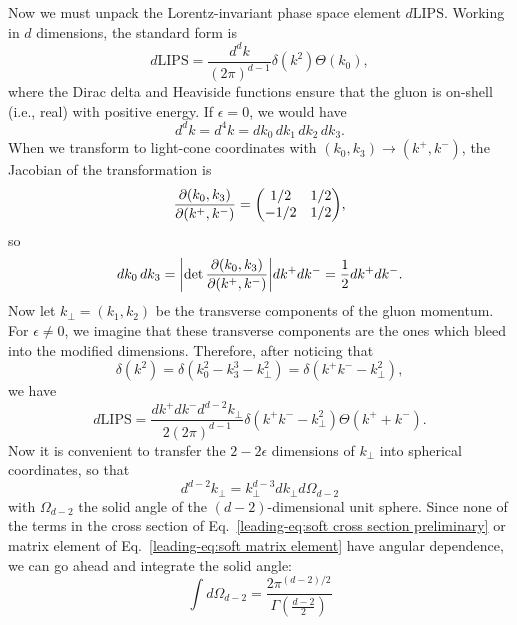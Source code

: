 \documentclass[../thesis.tex]{subfiles}
\providecommand{\LIPS}{\mathrm{LIPS}}
\begin{document}
	Now we must unpack the Lorentz-invariant phase space element $d\LIPS$. Working in $d$ dimensions, the standard form is
	\begin{equation}
		d\LIPS = \frac{d^d k}{(2\pi)^{d-1}}\delta(k^2)\Theta(k_0),
	\end{equation}
	where the Dirac delta and Heaviside functions ensure that the gluon is on-shell (i.e., real) with positive energy. If $\epsilon = 0$, we would have
	\begin{equation}
		d^d k = d^4 k = dk_0 \,dk_1 \,dk_2 \,dk_3.
	\end{equation}
	When we transform to light-cone coordinates with $(k_0, k_3) \to (k^+, k^-)$, the Jacobian of the transformation is
	\begin{equation}
		\frac{\partial(k_0, k_3)}{\partial(k^+, k^-)} = \mqty(1/2 & 1/2 \\ -1/2 & 1/2),
	\end{equation}
	so
	\begin{equation}
		dk_0 \, dk_3 = \abs{\det \frac{\partial(k_0, k_3)}{\partial(k^+, k^-)}} dk^+ dk^- = \frac{1}{2} dk^+ dk^-.
	\end{equation}
	Now let $k_\perp = (k_1, k_2)$ be the transverse components of the gluon momentum. For $\epsilon \neq 0$, we imagine that these transverse components are the ones which bleed into the modified dimensions. Therefore, after noticing that
	\begin{equation}
		\delta(k^2) = \delta(k_0^2 - k_3^3 - k_\perp^2) = \delta(k^+ k^- - k_\perp^2),
	\end{equation}
	we have
	\begin{equation}
		d\LIPS = \frac{dk^+ dk^- d^{d-2}k_\perp}{2(2\pi)^{d-1}} \delta(k^+ k^- - k_\perp^2)\Theta(k^+ + k^-).
	\end{equation}
	Now it is convenient to transfer the $2 - 2\epsilon$ dimensions of $k_\perp$ into spherical coordinates, so that
	\begin{equation}
		d^{d - 2}k_\perp = k_\perp^{d-3} dk_\perp d\Omega_{d-2}
	\end{equation}
	with $\Omega_{d-2}$ the solid angle of the $(d-2)$-dimensional unit sphere. Since none of the terms in the cross section of Eq.~\ref{leading-eq:soft cross section preliminary} or matrix element of Eq.~\ref{leading-eq:soft matrix element} have angular dependence, we can go ahead and integrate the solid angle:
	\begin{equation}
		\int d\Omega_{d-2} = \frac{2\pi^{(d-2)/2}}{\Gamma(\frac{d-2}{2})}
	\end{equation}
\end{document}
